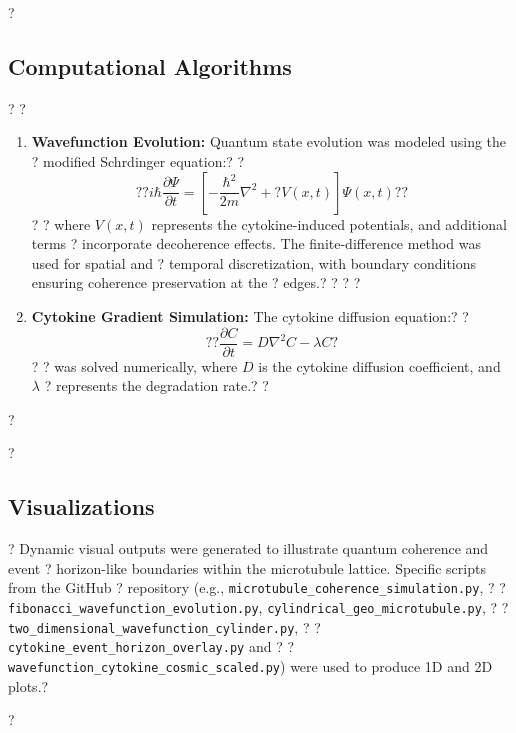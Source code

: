 ?\subsection{Computational Algorithms}?
?\begin{enumerate}?
?    \item \textbf{Wavefunction Evolution:} Quantum state evolution was modeled using the ?
modified Schrdinger equation:?
?    \begin{equation}?
?    i\hbar \frac{\partial \Psi}{\partial t} = \left[-\frac{\hbar^2}{2m}\nabla^2 + ?
V(x,t)\right]\Psi(x,t)?
?    \end{equation}?
?    where $V(x,t)$ represents the cytokine-induced potentials, and additional terms ?
incorporate decoherence effects. The finite-difference method was used for spatial and ?
temporal discretization, with boundary conditions ensuring coherence preservation at the ?
edges.?
?    ?
?    \item \textbf{Cytokine Gradient Simulation:} The cytokine diffusion equation:?
?    \begin{equation}?
?    \frac{\partial C}{\partial t} = D \nabla^2 C - \lambda C
?    \end{equation}?
?    was solved numerically, where $D$ is the cytokine diffusion coefficient, and $\lambda$ ?
represents the degradation rate.?
?\end{enumerate}?

?\subsection{Visualizations}?
Dynamic visual outputs were generated to illustrate quantum coherence and event ?
horizon-like boundaries within the microtubule lattice. Specific scripts from the GitHub ?
repository (e.g., \texttt{microtubule_coherence_simulation.py}, ?
?\texttt{fibonacci_wavefunction_evolution.py}, \texttt{cylindrical_geo_microtubule.py}, ?
?\texttt{two_dimensional_wavefunction_cylinder.py}, ?
?\texttt{cytokine_event_horizon_overlay.py} and ?
?\texttt{wavefunction_cytokine_cosmic_scaled.py}) were used to produce 1D and 2D plots.?

?%

